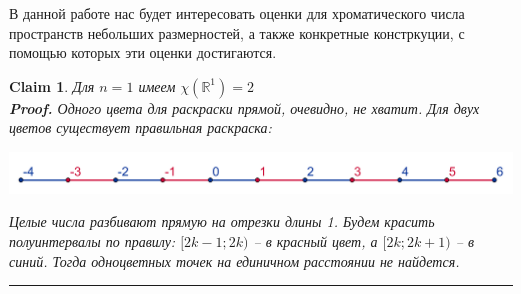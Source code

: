 \documentclass{report}%
\newtheorem{claim}[theorem]{Claim}
\newenvironment{proof}[1][Proof]{\textbf{#1.} }{\ \rule{0.5em}{0.5em}}
\begin{document}
\noindent В данной работе нас будет интересовать оценки для хроматического числа пространств
небольших размерностей, а также конкретные констркуции, с помощью которых эти оценки достигаются.

\begin{claim}
		Для $n = 1$ имеем $\chi(\mathbb{R}^1) = 2$ \\
		\begin{proof}
				Одного цвета для раскраски прямой, очевидно, не хватит. Для 
				двух цветов существует правильная раскраска: \\			
				\begin{center}
						\includegraphics[scale = 0.12]{R1}
				\end{center}
				
				Целые числа разбивают прямую на отрезки длины 1. Будем красить 
				полуинтервалы по правилу: $[2k - 1; 2k)$ – в красный цвет, а $[2k; 2k + 1)$ – в 
				синий. Тогда одноцветных точек на единичном расстоянии не найдется.
		\end{proof}
\end{claim}
\end{document}
